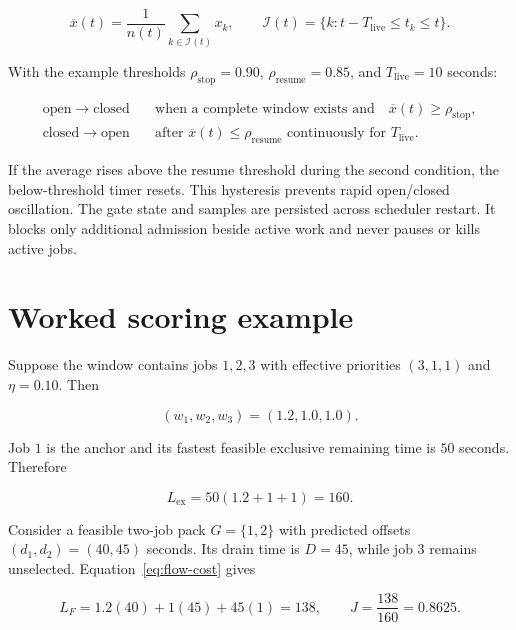 \documentclass[11pt]{article}
\begin{document}
\begin{equation}
  \overline x(t)=\frac{1}{n(t)}\sum_{k\in\mathcal I(t)}x_k,
  \qquad
  \mathcal I(t)=\{k:t-T_{\mathrm{live}}\le t_k\le t\}.
  \label{eq:rolling-memory}
\end{equation}

With the example thresholds
$\rho_{\mathrm{stop}}=0.90$,
$\rho_{\mathrm{resume}}=0.85$, and
$T_{\mathrm{live}}=10$ seconds:

\begin{align}
  \mathrm{open}\to\mathrm{closed}
  &\quad\text{when a complete window exists and}\quad
  \overline x(t)\ge\rho_{\mathrm{stop}}, \\
  \mathrm{closed}\to\mathrm{open}
  &\quad\text{after }\overline x(t)\le\rho_{\mathrm{resume}}
  \text{ continuously for }T_{\mathrm{live}}.
\end{align}

If the average rises above the resume threshold during the second condition,
the below-threshold timer resets.  This hysteresis prevents rapid open/closed
oscillation.  The gate state and samples are persisted across scheduler restart.
It blocks only additional admission beside active work and never pauses or kills
active jobs.

\section{Worked scoring example}

Suppose the window contains jobs $1,2,3$ with effective priorities
$(3,1,1)$ and $\eta=0.10$.  Then

\begin{equation}
  (w_1,w_2,w_3)=(1.2,1.0,1.0).
\end{equation}

Job $1$ is the anchor and its fastest feasible exclusive remaining time is
$50$ seconds.  Therefore

\begin{equation}
  L_{\mathrm{ex}}=50(1.2+1+1)=160.
\end{equation}

Consider a feasible two-job pack $G=\{1,2\}$ with predicted offsets
$(d_1,d_2)=(40,45)$ seconds.  Its drain time is $D=45$, while job $3$ remains
unselected.  Equation~\eqref{eq:flow-cost} gives

\begin{equation}
  L_F=1.2(40)+1(45)+45(1)=138,
  \qquad J=\frac{138}{160}=0.8625.
\end{equation}
\end{document}

